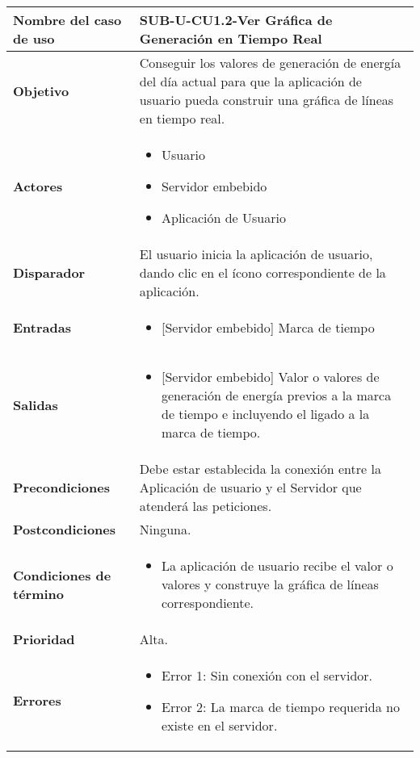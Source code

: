 \begin{longtable}{|J{5cm}|J{10.3cm}|}
	\hline
	\textbf{Nombre del caso de uso} &
		SUB-U-CU1.2-Ver Gráfica de Generación en Tiempo Real \\ \hline
	\textbf{Objetivo} &
		Conseguir los valores de generación de energía del día actual para que la aplicación de usuario pueda construir una gráfica de líneas en tiempo real. \\ \hline
	\textbf{Actores} &
		\begin{itemize}
		    \item Usuario
			\item Servidor embebido
			\item Aplicación de Usuario
		\end{itemize} \\ \hline
	\textbf{Disparador} & 
	    El usuario inicia la aplicación de usuario, dando clic en el ícono correspondiente de la aplicación.\\ \hline 
	\textbf{Entradas} & 
		\begin{itemize}
				\item{[Servidor embebido]} Marca de tiempo
		\end{itemize}\\ \hline 
	\textbf{Salidas} & 
		\begin{itemize}
			\item{[Servidor embebido]} Valor o valores de generación de energía previos a la marca de tiempo e incluyendo el ligado a la marca de tiempo.
		\end{itemize} \\ \hline
	\textbf{Precondiciones} &
		Debe estar establecida la conexión entre la Aplicación de usuario y el Servidor que atenderá las peticiones.
		\\ \hline
	\textbf{Postcondiciones} &
		Ninguna.\\ \hline
	\textbf{Condiciones de término} & 
		\begin{itemize}
			\item La aplicación de usuario recibe el valor o valores y construye la gráfica de líneas correspondiente.
		\end{itemize} \\ \hline 
	\textbf{Prioridad} & 
		Alta. \\ \hline
	\textbf{Errores} & 
		\begin{itemize}
		    \item \label{CUU1.2:Error1} Error 1: Sin conexión con el servidor.
			\item \label{CUU1.2:Error2} Error 2: La marca de tiempo requerida no existe en el servidor.

\end{itemize}
\end{longtable}
